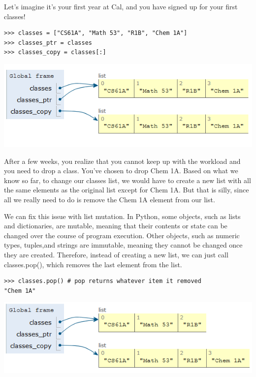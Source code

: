 Let’s imagine it’s your first year at Cal, and you have signed up for your first classes!
\begin{lstlisting}
>>> classes = ["CS61A", "Math 53", "R1B", "Chem 1A"]
>>> classes_ptr = classes
>>> classes_copy = classes[:]
\end{lstlisting}

\begin{center}
\includegraphics[scale=0.75]{pointers.PNG}
\end{center}
After a few weeks, you realize that you cannot keep up with the workload and you need to drop a class. You’ve chosen to drop Chem 1A. Based on what we know so far, to change our classes list, we would have to create a new list with all the same elements as the original list except for Chem 1A. But that is silly, since all we really need to do is remove the Chem 1A element from our list.

We can fix this issue with list mutation. In Python, some objects, such as lists and dictionaries, are mutable, meaning that their contents or state can be changed over the course of program execution. Other objects, such as numeric types, tuples,and strings are immutable, meaning they cannot be changed once they are created. Therefore, instead of creating a new list, we can just call classes.pop(), which removes the last element from the list.

\begin{lstlisting}
>>> classes.pop() # pop returns whatever item it removed
"Chem 1A"
\end{lstlisting}

\begin{center}
\includegraphics[scale=0.75]{pointers_mutate.PNG}
\end{center}


